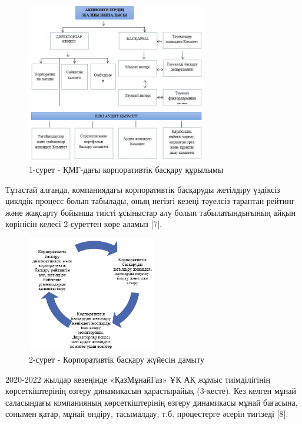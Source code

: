 \begin{figure}[H]
	\centering
	\includegraphics[width=0.7\textwidth]{assets/1361}
	\caption*{1-сурет - ҚМГ-дағы корпоративтік басқару құрылымы}
\end{figure}

\begin{multicols}{2}
Тұтастай алғанда, компаниядағы корпоративтік басқаруды жетілдіру
үздіксіз циклдік процесс болып табылады, оның негізгі кезеңі тәуелсіз
тараптан рейтинг және жақсарту бойынша тиісті ұсыныстар алу болып
табылатындығының айқын көрінісін келесі 2-суреттен көре аламыз {[}7{]}.
\end{multicols}

\begin{figure}[H]
	\centering
	\includegraphics[width=0.5\textwidth]{assets/1362}
	\caption*{2-сурет - Корпоративтік басқару жүйесін дамыту}
\end{figure}

\begin{multicols}{2}
2020-2022 жылдар кезеңінде «ҚазМұнайГаз» ҰК АҚ жұмыс тиімділігінің
көрсеткіштерінің өзгеру динамикасын қарастырайық (3-кесте). Кез келген
мұнай саласындағы компанияның көрсеткіштерінің өзгеру динамикасы мұнай
бағасына, сонымен қатар, мұнай өндіру, тасымалдау, т.б. процестерге
әсерін тигізеді {[}8{]}.
\end{multicols}

